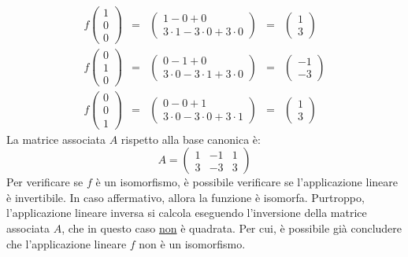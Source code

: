 \documentclass[a4paper]{article}
\begin{document}
	\begin{equation*}
		\begin{array}{lllll}
			f\begin{pmatrix}
				1 \\ 0 \\ 0
			\end{pmatrix} &=&
			\begin{pmatrix}
				1 - 0 + 0 \\
				3 \cdot 1 - 3 \cdot 0 + 3 \cdot 0
			\end{pmatrix} &=&
			\begin{pmatrix}
				1 \\ 3
			\end{pmatrix} \\ [1.8em]
			
			f\begin{pmatrix}
				0 \\ 1 \\ 0
			\end{pmatrix} &=&
			\begin{pmatrix}
				0 - 1 + 0 \\
				3 \cdot 0 - 3 \cdot 1 + 3 \cdot 0
			\end{pmatrix} &=&
			\begin{pmatrix}
				-1 \\ -3
			\end{pmatrix} \\ [1.8em]
			
			f\begin{pmatrix}
				0 \\ 0 \\ 1
			\end{pmatrix} &=&
			\begin{pmatrix}
				0 - 0 + 1 \\
				3 \cdot 0 - 3 \cdot 0 + 3 \cdot 1
			\end{pmatrix} &=&
			\begin{pmatrix}
				1 \\ 3
			\end{pmatrix}
		\end{array}
	\end{equation*}
	La matrice associata $A$ rispetto alla base canonica è:
	\begin{equation*}
		A = \begin{pmatrix}
			1 & -1 & 1 \\
			3 & -3 & 3
		\end{pmatrix}
	\end{equation*}
	Per verificare se $f$ è un isomorfismo, è possibile verificare se l'applicazione lineare è invertibile. In caso affermativo, allora la funzione è isomorfa. Purtroppo, l'applicazione lineare inversa si calcola eseguendo l'inversione della matrice associata $A$, che in questo caso \underline{non} è quadrata. Per cui, è possibile già concludere che l'applicazione lineare $f$ non è un isomorfismo.\newpage
	
\end{document}
